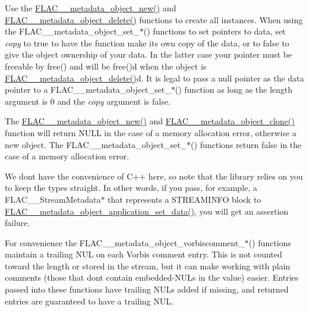 Use the \mbox{\hyperlink{group__flac__metadata__object_ga0d21a62648d8c5321b4b47f8ee5a52f0}{F\+L\+A\+C\+\_\+\+\_\+metadata\+\_\+object\+\_\+new()}} and \mbox{\hyperlink{group__flac__metadata__object_ga66bbe27dba68ba77be5af83986a280ea}{F\+L\+A\+C\+\_\+\+\_\+metadata\+\_\+object\+\_\+delete()}} functions to create all instances. When using the F\+L\+A\+C\+\_\+\+\_\+metadata\+\_\+object\+\_\+set\+\_\+$\ast$() functions to set pointers to data, set {\itshape copy} to {\ttfamily true} to have the function make it\textquotesingle{}s own copy of the data, or to {\ttfamily false} to give the object ownership of your data. In the latter case your pointer must be freeable by free() and will be free()d when the object is \mbox{\hyperlink{group__flac__metadata__object_ga66bbe27dba68ba77be5af83986a280ea}{F\+L\+A\+C\+\_\+\+\_\+metadata\+\_\+object\+\_\+delete()}}d. It is legal to pass a null pointer as the data pointer to a F\+L\+A\+C\+\_\+\+\_\+metadata\+\_\+object\+\_\+set\+\_\+$\ast$() function as long as the length argument is 0 and the {\itshape copy} argument is {\ttfamily false}.

The \mbox{\hyperlink{group__flac__metadata__object_ga0d21a62648d8c5321b4b47f8ee5a52f0}{F\+L\+A\+C\+\_\+\+\_\+metadata\+\_\+object\+\_\+new()}} and \mbox{\hyperlink{group__flac__metadata__object_ga16b828b246e9af941e3e616e6bcd74c0}{F\+L\+A\+C\+\_\+\+\_\+metadata\+\_\+object\+\_\+clone()}} function will return {\ttfamily N\+U\+LL} in the case of a memory allocation error, otherwise a new object. The F\+L\+A\+C\+\_\+\+\_\+metadata\+\_\+object\+\_\+set\+\_\+$\ast$() functions return {\ttfamily false} in the case of a memory allocation error.

We don\textquotesingle{}t have the convenience of C++ here, so note that the library relies on you to keep the types straight. In other words, if you pass, for example, a F\+L\+A\+C\+\_\+\+\_\+\+Stream\+Metadata$\ast$ that represents a S\+T\+R\+E\+A\+M\+I\+N\+FO block to \mbox{\hyperlink{group__flac__metadata__object_ga8f7fbaa68d5637e2409a053ec2ff744d}{F\+L\+A\+C\+\_\+\+\_\+metadata\+\_\+object\+\_\+application\+\_\+set\+\_\+data()}}, you will get an assertion failure.

For convenience the F\+L\+A\+C\+\_\+\+\_\+metadata\+\_\+object\+\_\+vorbiscomment\+\_\+$\ast$() functions maintain a trailing N\+UL on each Vorbis comment entry. This is not counted toward the length or stored in the stream, but it can make working with plain comments (those that don\textquotesingle{}t contain embedded-\/\+N\+U\+Ls in the value) easier. Entries passed into these functions have trailing N\+U\+Ls added if missing, and returned entries are guaranteed to have a trailing N\+UL.


